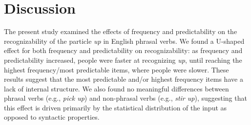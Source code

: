 \documentclass[
  authoryear,
  preprint,
  1p,
  onecolumn]{elsarticle}
\begin{document}
\section{Discussion}\label{discussion}

The present study examined the effects of frequency and predictability
on the recognizability of the particle \emph{up} in English phrasal
verbs. We found a U-shaped effect for both frequency and predictability
on recognizability: as frequency and predictability increased, people
were faster at recognizing \emph{up}, until reaching the highest
frequency/most predictable items, where people were slower. These
results suggest that the most predictable and/or highest frequency items
have a lack of internal structure. We also found no meaningful
differences between phrasal verbs (e.g., \emph{pick up}) and non-phrasal
verbs (e.g., \emph{stir up}), suggesting that this effect is driven
primarily by the statistical distribution of the input as opposed to
syntactic properties.
\end{document}
